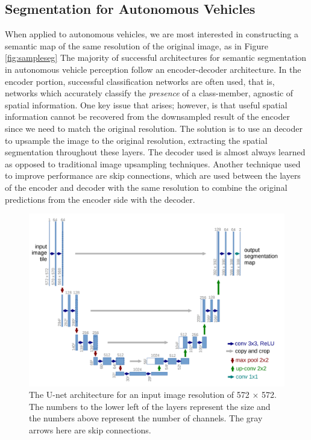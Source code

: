 \documentclass[10pt,twocolumn,letterpaper]{article}
\begin{document}
\subsection{Segmentation for Autonomous Vehicles}
When applied to autonomous vehicles, we are most interested in constructing a semantic map of the same resolution of the original image, as in Figure \ref{fig:sampleseg}
The majority of successful architectures for semantic segmentation in autonomous vehicle perception follow an encoder-decoder architecture. In the encoder portion, successful classification networks are often used, that is, networks which accurately classify the \textit{presence} of a class-member, agnostic of spatial information. One key issue that arises; however, is that useful spatial information cannot be recovered from the downsampled result of the encoder since we need to match the original resolution. The solution is to use an decoder to upsample the image to the original resolution, extracting the spatial segmentation throughout these layers. The decoder used is almost always learned as opposed to traditional image upsampling techniques. Another technique used to improve performance are skip connections, which are used between the layers of the encoder and decoder with the same resolution to combine the original predictions from the encoder side with the decoder.

\begin{figure}[t]
\begin{center}
    \includegraphics[width=\linewidth]{images/unet_arch.PNG}
\end{center}
   \caption{The U-net architecture for an input image resolution of 572 $\times$ 572. The numbers to the lower left of the layers represent the size and the numbers above represent the number of channels. The gray arrows here are skip connections.}
\label{fig:unet}
\end{figure}
\end{document}
